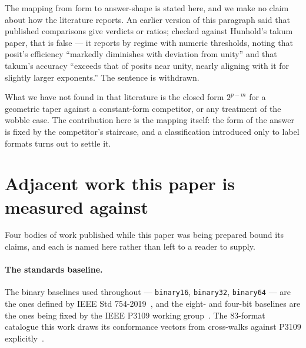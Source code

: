The mapping from form to answer-shape is stated here, and we make no claim about
how the literature reports. An earlier version of this paragraph said that
published comparisons give verdicts or ratios; checked against Hunhold's takum
paper, that is false --- it reports by regime with numeric thresholds, noting
that posit's efficiency ``markedly diminishes with deviation from unity'' and
that takum's accuracy ``exceeds that of posits near unity, nearly aligning with
it for slightly larger exponents.'' The sentence is withdrawn.

What we have not found in that literature is the closed form $2^{p-m}$ for a
geometric taper against a constant-form competitor, or any treatment of the
wobble case. The contribution here is the mapping itself: the form of the answer
is fixed by the competitor's staircase, and a classification introduced only to
label formats turns out to settle it.



\section{Adjacent work this paper is measured against}\label{sec:adjacent}

Four bodies of work published while this paper was being prepared bound its
claims, and each is named here rather than left to a reader to supply.

\paragraph{The standards baseline.} The binary baselines used throughout ---
\texttt{binary16}, \texttt{binary32}, \texttt{binary64} --- are the ones defined
by IEEE Std 754-2019~\cite{ieee754_2019}, and the eight- and four-bit baselines
are the ones being fixed by the IEEE P3109 working
group~\cite{p3109wg2026}. The 83-format catalogue this work draws its
conformance vectors from cross-walks against P3109 explicitly~\cite{catalogue}.

